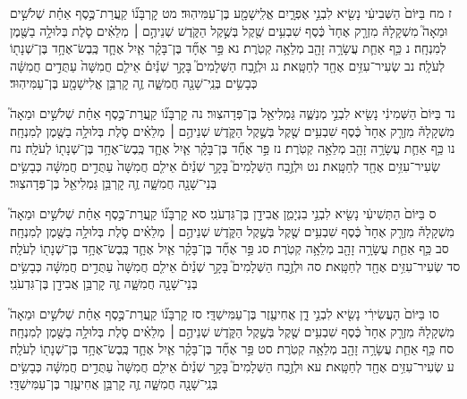 \documentclass[twoside, openany, parskip=half, 11pt]{book}
\begin{document}
ז מח בַּיּוֹם֙ הַשְּׁבִיעִ֔י נָשִׂ֖יא לִבְנֵ֣י אֶפְרָ֑יִם אֱלִֽישָׁמָ֖ע בֶּן־עַמִּיהֽוּד׃ מט קׇרְבָּנ֞וֹ קַֽעֲרַת־כֶּ֣סֶף אַחַ֗ת שְׁלֹשִׁ֣ים וּמֵאָה֮ מִשְׁקָלָהּ֒ מִזְרָ֤ק אֶחָד֙ כֶּ֔סֶף שִׁבְעִ֥ים שֶׁ֖קֶל בְּשֶׁ֣קֶל הַקֹּ֑דֶשׁ שְׁנֵיהֶ֣ם ׀ מְלֵאִ֗ים סֹ֛לֶת בְּלוּלָ֥ה בַשֶּׁ֖מֶן לְמִנְחָֽה׃ נ כַּ֥ף אַחַ֛ת עֲשָׂרָ֥ה זָהָ֖ב מְלֵאָ֥ה קְטֹֽרֶת׃ נא פַּ֣ר אֶחָ֞ד בֶּן־בָּקָ֗ר אַ֧יִל אֶחָ֛ד כֶּֽבֶשׂ־אֶחָ֥ד בֶּן־שְׁנָת֖וֹ לְעֹלָֽה׃ נב שְׂעִיר־עִזִּ֥ים אֶחָ֖ד לְחַטָּֽאת׃ נג וּלְזֶ֣בַח הַשְּׁלָמִים֮ בָּקָ֣ר שְׁנַ֒יִם֒ אֵילִ֤ם חֲמִשָּׁה֙ עַתֻּדִ֣ים חֲמִשָּׁ֔ה כְּבָשִׂ֥ים בְּנֵֽי־שָׁנָ֖ה חֲמִשָּׁ֑ה זֶ֛ה קׇרְבַּ֥ן אֱלִישָׁמָ֖ע בֶּן־עַמִּיהֽוּד׃

נד בַּיּוֹם֙ הַשְּׁמִינִ֔י נָשִׂ֖יא לִבְנֵ֣י מְנַשֶּׁ֑ה גַּמְלִיאֵ֖ל בֶּן־פְּדָהצֽוּר׃ נה קׇרְבָּנ֞וֹ קַֽעֲרַת־כֶּ֣סֶף אַחַ֗ת שְׁלֹשִׁ֣ים וּמֵאָה֮ מִשְׁקָלָהּ֒ מִזְרָ֤ק אֶחָד֙ כֶּ֔סֶף שִׁבְעִ֥ים שֶׁ֖קֶל בְּשֶׁ֣קֶל הַקֹּ֑דֶשׁ שְׁנֵיהֶ֣ם ׀ מְלֵאִ֗ים סֹ֛לֶת בְּלוּלָ֥ה בַשֶּׁ֖מֶן לְמִנְחָֽה׃ נו כַּ֥ף אַחַ֛ת עֲשָׂרָ֥ה זָהָ֖ב מְלֵאָ֥ה קְטֹֽרֶת׃ נז פַּ֣ר אֶחָ֞ד בֶּן־בָּקָ֗ר אַ֧יִל אֶחָ֛ד כֶּֽבֶשׂ־אֶחָ֥ד בֶּן־שְׁנָת֖וֹ לְעֹלָֽה׃ נח שְׂעִיר־עִזִּ֥ים אֶחָ֖ד לְחַטָּֽאת׃ נט וּלְזֶ֣בַח הַשְּׁלָמִים֮ בָּקָ֣ר שְׁנַ֒יִם֒ אֵילִ֤ם חֲמִשָּׁה֙ עַתֻּדִ֣ים חֲמִשָּׁ֔ה כְּבָשִׂ֥ים בְּנֵי־שָׁנָ֖ה חֲמִשָּׁ֑ה זֶ֛ה קׇרְבַּ֥ן גַּמְלִיאֵ֖ל בֶּן־פְּדָהצֽוּר׃

ס בַּיּוֹם֙ הַתְּשִׁיעִ֔י נָשִׂ֖יא לִבְנֵ֣י בִנְיָמִ֑ן אֲבִידָ֖ן בֶּן־גִּדְעֹנִֽי׃ סא קׇרְבָּנ֞וֹ קַֽעֲרַת־כֶּ֣סֶף אַחַ֗ת שְׁלֹשִׁ֣ים וּמֵאָה֮ מִשְׁקָלָהּ֒ מִזְרָ֤ק אֶחָד֙ כֶּ֔סֶף שִׁבְעִ֥ים שֶׁ֖קֶל בְּשֶׁ֣קֶל הַקֹּ֑דֶשׁ שְׁנֵיהֶ֣ם ׀ מְלֵאִ֗ים סֹ֛לֶת בְּלוּלָ֥ה בַשֶּׁ֖מֶן לְמִנְחָֽה׃ סב כַּ֥ף אַחַ֛ת עֲשָׂרָ֥ה זָהָ֖ב מְלֵאָ֥ה קְטֹֽרֶת׃ סג פַּ֣ר אֶחָ֞ד בֶּן־בָּקָ֗ר אַ֧יִל אֶחָ֛ד כֶּֽבֶשׂ־אֶחָ֥ד בֶּן־שְׁנָת֖וֹ לְעֹלָֽה׃ סד שְׂעִיר־עִזִּ֥ים אֶחָ֖ד לְחַטָּֽאת׃ סה וּלְזֶ֣בַח הַשְּׁלָמִים֮ בָּקָ֣ר שְׁנַ֒יִם֒ אֵילִ֤ם חֲמִשָּׁה֙ עַתֻּדִ֣ים חֲמִשָּׁ֔ה כְּבָשִׂ֥ים בְּנֵי־שָׁנָ֖ה חֲמִשָּׁ֑ה זֶ֛ה קׇרְבַּ֥ן אֲבִידָ֖ן בֶּן־גִּדְעֹנִֽי׃

סו בַּיּוֹם֙ הָעֲשִׂירִ֔י נָשִׂ֖יא לִבְנֵ֣י דָ֑ן אֲחִיעֶ֖זֶר בֶּן־עַמִּישַׁדָּֽי׃ סז קׇרְבָּנ֞וֹ קַֽעֲרַת־כֶּ֣סֶף אַחַ֗ת שְׁלֹשִׁ֣ים וּמֵאָה֮ מִשְׁקָלָהּ֒ מִזְרָ֤ק אֶחָד֙ כֶּ֔סֶף שִׁבְעִ֥ים שֶׁ֖קֶל בְּשֶׁ֣קֶל הַקֹּ֑דֶשׁ שְׁנֵיהֶ֣ם ׀ מְלֵאִ֗ים סֹ֛לֶת בְּלוּלָ֥ה בַשֶּׁ֖מֶן לְמִנְחָֽה׃ סח כַּ֥ף אַחַ֛ת עֲשָׂרָ֥ה זָהָ֖ב מְלֵאָ֥ה קְטֹֽרֶת׃ סט פַּ֣ר אֶחָ֞ד בֶּן־בָּקָ֗ר אַ֧יִל אֶחָ֛ד כֶּֽבֶשׂ־אֶחָ֥ד בֶּן־שְׁנָת֖וֹ לְעֹלָֽה׃ ע שְׂעִיר־עִזִּ֥ים אֶחָ֖ד לְחַטָּֽאת׃ עא וּלְזֶ֣בַח הַשְּׁלָמִים֮ בָּקָ֣ר שְׁנַ֒יִם֒ אֵילִ֤ם חֲמִשָּׁה֙ עַתֻּדִ֣ים חֲמִשָּׁ֔ה כְּבָשִׂ֥ים בְּנֵֽי־שָׁנָ֖ה חֲמִשָּׁ֑ה זֶ֛ה קׇרְבַּ֥ן אֲחִיעֶ֖זֶר בֶּן־עַמִּישַׁדָּֽי׃
\end{document}
